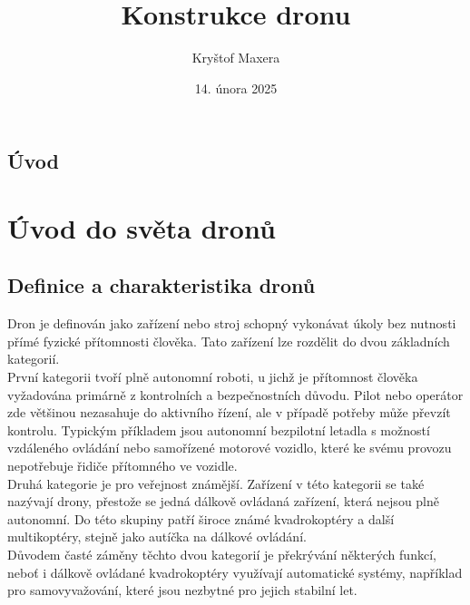 \documentclass[12pt]{report}
\author{Kryštof Maxera}                  %
\title{Konstrukce dronu}    %
\date{14. února 2025}                 %
\begin{document}
	\mytitlepage						%
	
	
	\abstrakt{
		\lipsum[1]						%
	}{
		\lipsum[1]						%
	}
	
	\podekovani{
		\lipsum[2]						%
	}
	
   {\tableofcontents\newpage}			%
	
\addtocounter{page}{1}		%
\chapter*{Úvod}     %
	
\lipsum[1]	
	
\part[Úvod do světa dronů]{Úvod do světa dronů}  %

\chapter[Definice a charakteristika dronů]{Definice a charakteristika dronů}

Dron je definován jako zařízení nebo stroj schopný vykonávat úkoly bez nutnosti přímé fyzické přítomnosti člověka. Tato zařízení lze rozdělit do dvou základních kategorií.\\
První kategorii tvoří plně autonomní roboti, u jichž je přítomnost člověka vyžadována primárně z kontrolních a bezpečnostních důvodu. Pilot nebo operátor zde většinou nezasahuje do aktivního řízení, ale v případě potřeby může převzít kontrolu. Typickým příkladem jsou autonomní bezpilotní letadla s možností vzdáleného ovládání nebo samořízené motorové vozidlo, které ke svému provozu nepotřebuje řidiče přítomného ve vozidle.\\
Druhá kategorie je pro veřejnost známější. Zařízení v této kategorii se také nazývají drony, přestože se jedná dálkově ovládaná zařízení, která nejsou plně autonomní. Do této skupiny patří široce známé kvadrokoptéry a další multikoptéry, stejně jako autíčka na dálkové ovládání.\\
Důvodem časté záměny těchto dvou kategorií je překrývání některých funkcí, neboť i dálkově ovládané kvadrokoptéry využívají automatické systémy, například pro samovyvažování, které jsou nezbytné pro jejich stabilní let.\cite{mainbook}\\
\end{document}
